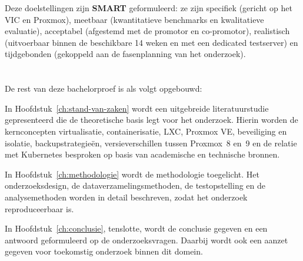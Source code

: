 Deze doelstellingen zijn \textbf{SMART} geformuleerd: ze zijn specifiek (gericht op het VIC en Proxmox), meetbaar (kwantitatieve benchmarks en kwalitatieve evaluatie), acceptabel (afgestemd met de promotor en co-promotor), realistisch (uitvoerbaar binnen de beschikbare 14 weken en met een dedicated testserver) en tijdgebonden (gekoppeld aan de fasenplanning van het onderzoek).

\section{}%
\label{sec:opzet-bachelorproef}

De rest van deze bachelorproef is als volgt opgebouwd:

In Hoofdstuk~\ref{ch:stand-van-zaken} wordt een uitgebreide literatuurstudie gepresenteerd die de theoretische basis legt voor het onderzoek. Hierin worden de kernconcepten virtualisatie, containerisatie, LXC, Proxmox VE, beveiliging en isolatie, backupstrategieën, versieverschillen tussen Proxmox~8 en~9 en de relatie met Kubernetes besproken op basis van academische en technische bronnen.

In Hoofdstuk~\ref{ch:methodologie} wordt de methodologie toegelicht. Het onderzoeksdesign, de dataverzamelingsmethoden, de testopstelling en de analysemethoden worden in detail beschreven, zodat het onderzoek reproduceerbaar is.


In Hoofdstuk~\ref{ch:conclusie}, tenslotte, wordt de conclusie gegeven en een antwoord geformuleerd op de onderzoeksvragen. Daarbij wordt ook een aanzet gegeven voor toekomstig onderzoek binnen dit domein.
